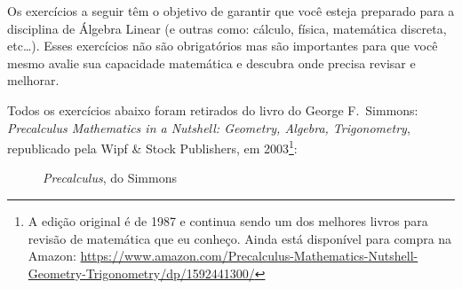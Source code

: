 \documentclass[pdftex, brazil, 12pt, oneside, addpoints]{exam}
\newcommand{\ingles}[1]{\textit{#1}}
\begin{document}
\newpage

Os exercícios a seguir têm o objetivo de garantir que você esteja preparado para
a disciplina de Álgebra Linear (e outras como: cálculo, física, matemática
discreta, etc\ldots). Esses exercícios não são obrigatórios mas são importantes
para que você mesmo avalie sua capacidade matemática e descubra onde precisa
revisar e melhorar.

Todos os exercícios abaixo foram retirados do livro do George F.\ Simmons:
\ingles{Precalculus Mathematics in a Nutshell: Geometry, Algebra, Trigonometry},
republicado pela Wipf \& Stock Publishers, em 2003\footnote{A edição original é de
1987 e continua sendo um dos melhores livros para revisão de matemática que eu
conheço. Ainda está disponível para compra na Amazon: \url{https://www.amazon.com/Precalculus-Mathematics-Nutshell-Geometry-Trigonometry/dp/1592441300/}}:

\begin{figure}[H]
  \begin{center}
    \caption{\ingles{Precalculus}, do Simmons}
    \label{fig:simmons}
  \end{center}
\end{figure}
\end{document}
